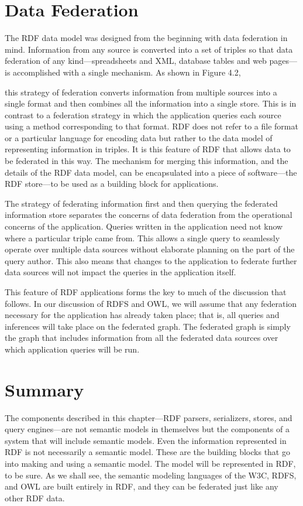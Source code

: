 \section{Data Federation}

The RDF data model was designed from the beginning with data federation
in mind. Information from any source is converted into a set of triples
so that data federation of any kind---spreadsheets and XML, database
tables and web pages---is accomplished with a single mechanism. As shown
in Figure 4.2,

this strategy of federation converts information from multiple sources
into a single format and then combines all the information into a single
store. This is in contrast to a federation strategy in which the
application queries each source using a method corresponding to that
format. RDF does not refer to a file format or a particular language for
encoding data but rather to the data model of representing information
in triples. It is this feature of RDF that allows data to be federated
in this way. The mechanism for merging this information, and the details
of the RDF data model, can be encapsulated into a piece of
software---the RDF store---to be used as a building block for
applications.

The strategy of federating information first and then querying the
federated information store separates the concerns of data federation
from the operational concerns of the application. Queries written in the
application need not know where a particular triple came from. This
allows a single query to seamlessly operate over multiple data sources
without elaborate planning on the part of the query author. This also
means that changes to the application to federate further data sources
will not impact the queries in the application itself.

This feature of RDF applications forms the key to much of the discussion
that follows. In our discussion of RDFS and OWL, we will assume that any
federation necessary for the application has already taken place; that
is, all queries and inferences will take place on the federated graph.
The federated graph is simply the graph that includes information from
all the federated data sources over which application queries will be
run.

\section{Summary}

The components described in this chapter---RDF parsers, serializers,
stores, and query engines---are not semantic models in themselves but
the components of a system that will include semantic models. Even the
information represented in RDF is not necessarily a semantic model.
These are the building blocks that go into making and using a semantic
model. The model will be represented in RDF, to be sure. As we shall
see, the semantic modeling languages of the W3C, RDFS, and OWL are built
entirely in RDF, and they can be federated just like any other RDF data.

